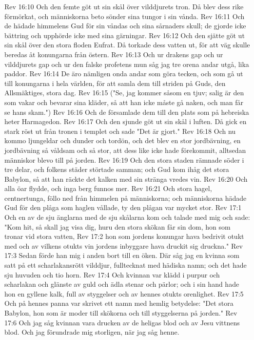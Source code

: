 Rev 16:10  Och den femte göt ut sin skål över vilddjurets tron. Då blev dess rike förmörkat, och människorna beto sönder sina tungor i sin vånda.
Rev 16:11  Och de hädade himmelens Gud för sin våndas och sina sårnaders skull; de gjorde icke bättring och upphörde icke med sina gärningar.
Rev 16:12  Och den sjätte göt ut sin skål över den stora floden Eufrat. Då torkade dess vatten ut, för att väg skulle beredas åt konungarna från östern.
Rev 16:13  Och ur drakens gap och ur vilddjurets gap och ur den falske profetens mun såg jag tre orena andar utgå, lika paddor.
Rev 16:14  De äro nämligen onda andar som göra tecken, och som gå ut till konungarna i hela världen, för att samla dem till striden på Guds, den Allsmäktiges, stora dag.
Rev 16:15  ("Se, jag kommer såsom en tjuv; salig är den som vakar och bevarar sina kläder, så att han icke måste gå naken, och man får se hans skam.")
Rev 16:16  Och de församlade dem till den plats som på hebreiska heter Harmagedon.
Rev 16:17  Och den sjunde göt ut sin skål i luften. Då gick en stark röst ut från tronen i templet och sade "Det är gjort."
Rev 16:18  Och nu kommo ljungeldar och dunder och tordön, och det blev en stor jordbävning, en jordbävning så våldsam och så stor, att dess like icke hade förekommit, alltsedan människor blevo till på jorden.
Rev 16:19  Och den stora staden rämnade söder i tre delar, och folkens städer störtade samman; och Gud kom ihåg det stora Babylon, så att han räckte det kalken med sin stränga vredes vin.
Rev 16:20  Och alla öar flydde, och inga berg funnos mer.
Rev 16:21  Och stora hagel, centnertunga, föllo ned från himmelen på människorna; och människorna hädade Gud för den plåga som haglen vållade, ty den plågan var mycket stor.
Rev 17:1  Och en av de sju änglarna med de sju skålarna kom och talade med mig och sade: "Kom hit, så skall jag visa dig, huru den stora skökan får sin dom, hon som tronar vid stora vatten,
Rev 17:2  hon som jordens konungar hava bedrivit otukt med och av vilkens otukts vin jordens inbyggare hava druckit sig druckna."
Rev 17:3  Sedan förde han mig i anden bort till en öken. Där såg jag en kvinna som satt på ett scharlakansrött vilddjur, fulltecknat med hädiska namn; och det hade sju huvuden och tio horn.
Rev 17:4  Och kvinnan var klädd i purpur och scharlakan och glänste av guld och ädla stenar och pärlor; och i sin hand hade hon en gyllene kalk, full av styggelser och av hennes otukts orenlighet.
Rev 17:5  Och på hennes panna var skrivet ett namn med hemlig betydelse: "Det stora Babylon, hon som är moder till skökorna och till styggelserna på jorden."
Rev 17:6  Och jag såg kvinnan vara drucken av de heligas blod och av Jesu vittnens blod. Och jag förundrade mig storligen, när jag såg henne.
